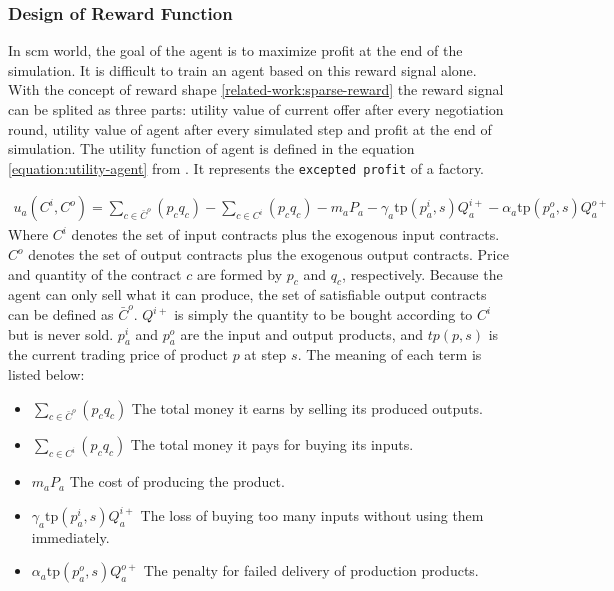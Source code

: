 \subsubsection{Design of Reward Function} \label{analysis:scml:design-of-reward-function}
In \gls{scm} world, the goal of the agent is to maximize profit at the end of the simulation. It is difficult to train an agent based on this reward signal alone. With the concept of reward shape \ref{related-work:sparse-reward} the reward signal can be splited as three parts: utility value of current offer after every negotiation round, utility value of agent after every simulated step and profit at the end of simulation. The utility function of agent is defined in the equation \ref{equation:utility-agent} from \parencite{Mohammad2021}. It represents the \texttt{excepted profit} of a factory.

\begin{equation} \label{equation:utility-agent}
\begin{aligned}
u_{a}\left(C^{i}, C^{o}\right)=\sum_{c \in \bar{C}^{o}}\left(p_{c} q_{c}\right)-\sum_{c \in C^{i}}\left(p_{c} q_{c}\right)-m_{a} P_{a}-\gamma_{a} \mathrm{t} \mathrm{p}\left(p_{a}^{i}, s\right) Q_{a}^{i+}-\alpha_{a} \mathrm{tp}\left(p_{a}^{o}, s\right) Q_{a}^{o+}
\end{aligned}
\end{equation}
Where $C^{i}$ denotes the set of input contracts plus the exogenous input contracts. $C^{o}$ denotes the set of output contracts plus the exogenous output contracts. Price and quantity of the contract $c$ are formed by $p_c$ and $q_c$, respectively. Because the agent can only sell what it can produce, the set of satisfiable output contracts can be defined as $\bar{C}^{o}$. $Q^{i+}$ is simply the quantity to be bought  according to $C^{i}$ but is never sold. $p_{a}^{i}$ and $p_{a}^{o}$ are the input and output products, and $tp(p, s)$ is the current trading price of product $p$ at step $s$. The meaning of each term is listed below:
\begin{itemize}
\item \textbf{$\sum_{c \in \bar{C}^{o}}\left(p_{c} q_{c}\right)$} The total money it earns by selling its produced outputs.  
\item \textbf{$\sum_{c \in C^{i}}\left(p_{c} q_{c}\right)$} The total money it pays for buying its inputs.
\item \textbf{$m_{a} P_{a}$} The cost of producing the product.
\item \textbf{$\gamma_{a} \mathrm{t} \mathrm{p}\left(p_{a}^{i}, s\right) Q_{a}^{i+}$} The loss of buying too many inputs without using them immediately.
\item \textbf{$\alpha_{a} \mathrm{tp}\left(p_{a}^{o}, s\right) Q_{a}^{o+}$} The penalty for failed delivery of production products.
\end{itemize}

